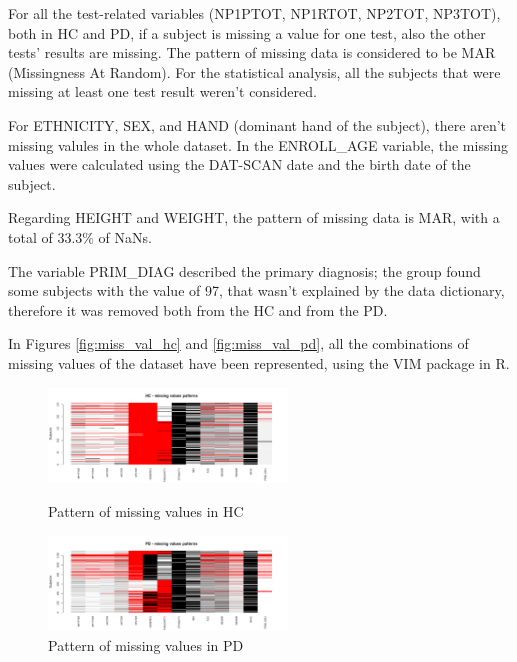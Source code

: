 \documentclass[]{article}
\begin{document}
\begin{multicols}{2}
For all the test-related variables (NP1PTOT, NP1RTOT, NP2TOT, NP3TOT), both in HC and PD, if a subject is missing a value for one test, also the other tests' results are missing. The pattern of missing data is considered to be MAR (Missingness At Random). For the statistical analysis, all the subjects that were missing at least one test result weren't considered.  

For ETHNICITY, SEX, and HAND (dominant hand of the subject), there aren't missing valules in the whole dataset. In the ENROLL\_AGE variable, the missing values were calculated using the DAT-SCAN date and the birth date of the subject.

Regarding HEIGHT and WEIGHT, the pattern of missing data is MAR, with a total of 33.3\% of NaNs. 

The variable PRIM\_DIAG described the primary diagnosis; the group found some subjects with the value of 97, that wasn't explained by the data dictionary, therefore it was removed both from the HC and from the PD. 

In Figures \ref{fig:miss_val_hc} and \ref{fig:miss_val_pd}, all the combinations of missing values of the dataset have been represented, using the VIM package in R.
\end{multicols}

\begin{figure}[h]
	\centering
	\parbox{2.8in}{
		\centering
		\includegraphics[width=2.5in]{../missing_patterns_hc}
		\caption{Pattern of missing values in HC}
		\label{fig:miss_patt_hc}}
	\begin{minipage}{2.8in}
		\centering
		\includegraphics[width=2.5in]{../missing_patterns_pd}
		\caption{Pattern of missing values in PD}
		\label{fig:miss_patt_pd}
	\end{minipage}
\end{figure}
\end{document}
